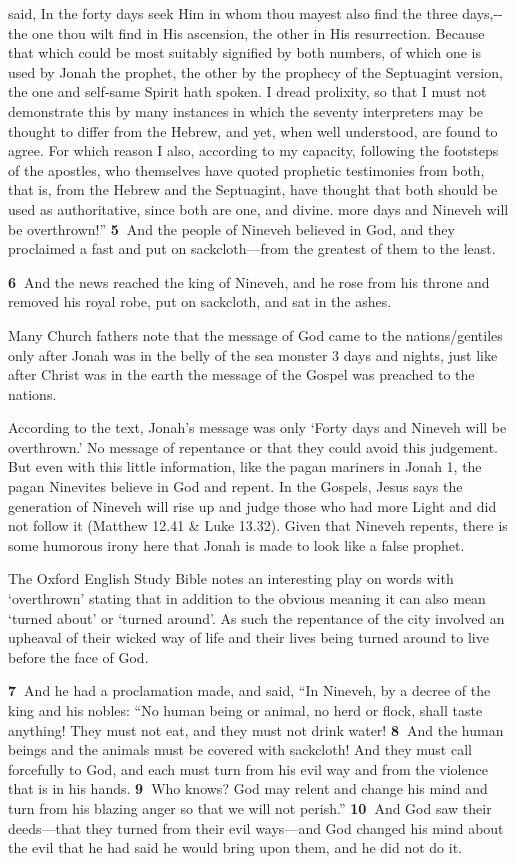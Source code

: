 \documentclass[
]{article}
\newcommand{\RL}[1]{\beginR #1\endR}
\begin{document}
{  said, In the forty days seek Him in whom thou mayest also find the
  three days,-\/-the one thou wilt find in His ascension, the other in
  His resurrection. Because that which could be most suitably signified
  by both numbers, of which one is used by Jonah the prophet, the other
  by the prophecy of the Septuagint version, the one and self-same
  Spirit hath spoken. I dread prolixity, so that I must not demonstrate
  this by many instances in which the seventy interpreters may be
  thought to differ from the Hebrew, and yet, when well understood, are
  found to agree. For which reason I also, according to my capacity,
  following the footsteps of the apostles, who themselves have quoted
  prophetic testimonies from both, that is, from the Hebrew and the
  Septuagint, have thought that both should be used as authoritative,
  since both are one, and divine.} more days and Nineveh will be
overthrown!'' \textbf{5~}And the people of Nineveh believed in God, and
they proclaimed a fast and put on sackcloth---from the greatest of them
to the least.

\textbf{6~}And the news reached the king of Nineveh, and he rose from
his throne and removed his royal robe, put on sackcloth, and sat in the
ashes.

Many Church fathers note that the message of God came to the
nations/gentiles only after Jonah was in the belly of the sea monster 3
days and nights, just like after Christ was in the earth the message of
the Gospel was preached to the nations.

According to the text, Jonah\RL{'}s message was only \RL{`}Forty days
and Nineveh will be overthrown.\RL{'} No message of repentance or that
they could avoid this judgement. But even with this little information,
like the pagan mariners in Jonah 1, the pagan Ninevites believe in God
and repent. In the Gospels, Jesus says the generation of Nineveh will
rise up and judge those who had more Light and did not follow it
(Matthew 12.41 \& Luke 13.32). Given that Nineveh repents, there is some
humorous irony here that Jonah is made to look like a false prophet.

The Oxford English Study Bible notes an interesting play on words with
`overthrown' stating that in addition to the obvious meaning it can also
mean `turned about' or `turned around'. As such the repentance of the
city involved an upheaval of their wicked way of life and their lives
being turned around to live before the face of God.

\textbf{7~}And he had a proclamation made, and said, \RL{``}In Nineveh,
by a decree of the king and his nobles: \RL{``}No human being or animal,
no herd or flock, shall taste anything! They must not eat, and they must
not drink water! \textbf{8~}And the human beings and the animals must be
covered with sackcloth! And they must call forcefully to God, and each
must turn from his evil way and from the violence that is in his hands.
\textbf{9~}Who knows? God may relent and change his mind and turn from
his blazing anger so that we will not perish.'' \textbf{10~}And God saw
their deeds---that they turned from their evil ways---and God changed
his mind about the evil that he had said he would bring upon them, and
he did not do it.
\end{document}

